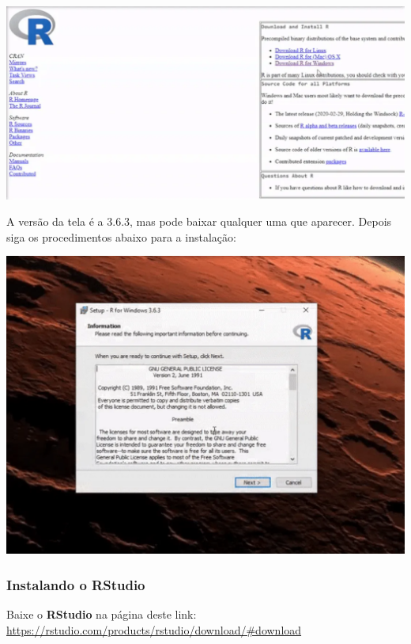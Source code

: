 \documentclass[
]{article}
\begin{document}
\includegraphics{gif_intro_download_R.webp}

A versão da tela é a 3.6.3, mas pode baixar qualquer uma que aparecer.
Depois siga os procedimentos abaixo para a instalação:

\includegraphics{gif_intro_install_R.webp}

\hypertarget{instalando-o-rstudio}{%
\subsubsection{\texorpdfstring{Instalando o
\textbf{RStudio}}{Instalando o RStudio}}\label{instalando-o-rstudio}}

Baixe o \textbf{RStudio} na página deste link:
\url{https://rstudio.com/products/rstudio/download/\#download}
\end{document}
